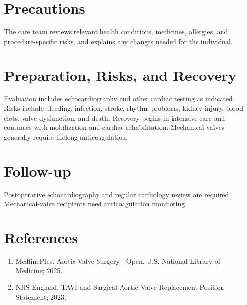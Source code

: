 \section*{Precautions}
The care team reviews relevant health conditions, medicines, allergies, and procedure-specific risks, and explains any changes needed for the individual.

\section*{Preparation, Risks, and Recovery}
Evaluation includes echocardiography and other cardiac testing as indicated. Risks include bleeding, infection, stroke, rhythm problems, kidney injury, blood clots, valve dysfunction, and death. Recovery begins in intensive care and continues with mobilization and cardiac rehabilitation. Mechanical valves generally require lifelong anticoagulation.

\section*{Follow-up}
Postoperative echocardiography and regular cardiology review are required. Mechanical-valve recipients need anticoagulation monitoring.

\section*{References}
\begin{enumerate}
  \item MedlinePlus. Aortic Valve Surgery---Open. U.S. National Library of Medicine; 2025.
  \item NHS England. TAVI and Surgical Aortic Valve Replacement Position Statement; 2023.
\end{enumerate}

\clearpage
